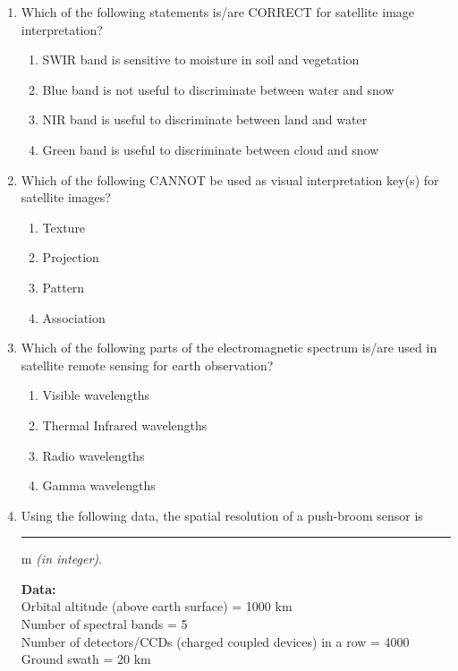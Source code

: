 \documentclass[12pt]{article}
\begin{document}
\begin{enumerate}
\item Which of the following statements is/are CORRECT for satellite image
interpretation?

\begin{enumerate}
    \item SWIR band is sensitive to moisture in soil and vegetation 
   \item Blue band is not useful to discriminate between water and snow 
   \item NIR band is useful to discriminate between land and water 
   \item Green band is useful to discriminate between cloud and snow 
\end{enumerate}

\item Which of the following CANNOT be used as visual interpretation key(s) for
satellite images?

\begin{enumerate}
    \item Texture 
   \item Projection 
   \item Pattern 
   \item Association  
\end{enumerate}
    
\item Which of the following parts of the electromagnetic spectrum is/are used in
satellite remote sensing for earth observation? 

\begin{enumerate}
    \item Visible wavelengths 
   \item Thermal Infrared wavelengths 
   \item Radio wavelengths 
   \item Gamma wavelengths
\end{enumerate}

\item Using the following data, the spatial resolution of a push-broom sensor
is \rule{2cm}{0.15mm} m \textit{(in integer)}.

    \textbf{Data:}\\
   Orbital altitude (above earth surface) = 1000 km\\
  Number of spectral bands = 5\\
  Number of detectors/CCDs (charged coupled devices) in a row = 4000\\
  Ground swath = 20 km\\


\end{enumerate}
\end{document}
